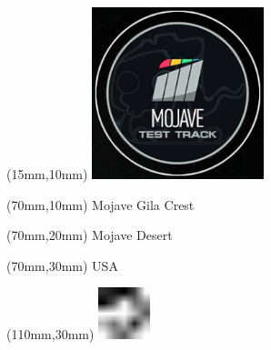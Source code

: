 \null\newpage
\begin{textblock*}{50mm}(15mm,10mm)%
\includegraphics[width=50mm]{LG/MOJA.png}
\end{textblock*}
\begin{textblock*}{130mm}(70mm,10mm)%
{\fontsize{20}{20}\selectfont Mojave Gila Crest}\\
\end{textblock*}
\begin{textblock*}{120mm}(70mm,20mm)%
{\fontsize{16}{16}\selectfont Mojave Desert}\\
\end{textblock*}
\begin{textblock*}{120mm}(70mm,30mm)%
{\fontsize{12}{12}\selectfont USA}
\end{textblock*}
\begin{textblock*}{30mm}(110mm,30mm)%
\centering
\includegraphics[height=15mm]{icons/fa-rotate-left.pdf}
\end{textblock*}
